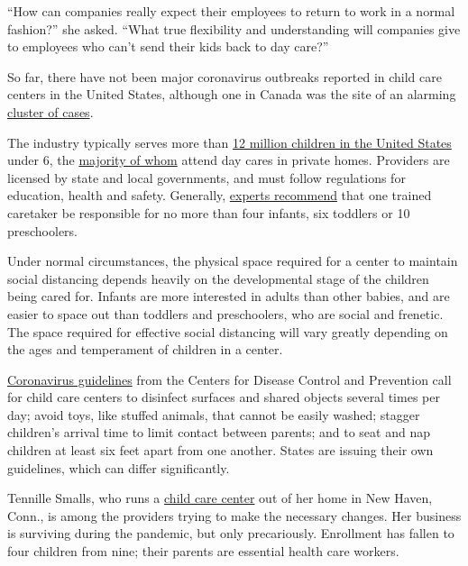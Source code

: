 ``How can companies really expect their employees to return to work in a
normal fashion?'' she asked. ``What true flexibility and understanding
will companies give to employees who can't send their kids back to day
care?''

So far, there have not been major coronavirus outbreaks reported in
child care centers in the United States, although one in Canada was the
site of an alarming
\href{https://montreal.ctvnews.ca/16-infected-north-of-montreal-in-quebec-s-first-covid-19-outbreak-in-a-daycare-1.4927853}{cluster
of cases}.

The industry typically serves more than
\href{https://cdn2.hubspot.net/hubfs/3957809/State\%20Fact\%20Sheets\%202019/2019StateFactSheets-Overview.pdf}{12
million children in the United States} under 6, the
\href{https://www.childtrends.org/most-child-care-providers-in-the-united-states-are-based-in-homes-not-centers}{majority
of whom} attend day cares in private homes. Providers are licensed by
state and local governments, and must follow regulations for education,
health and safety. Generally,
\href{https://www.childcare.gov/index.php/consumer-education/ratios-and-group-sizes}{experts
recommend} that one trained caretaker be responsible for no more than
four infants, six toddlers or 10 preschoolers.

Under normal circumstances, the physical space required for a center to
maintain social distancing depends heavily on the developmental stage of
the children being cared for. Infants are more interested in adults than
other babies, and are easier to space out than toddlers and
preschoolers, who are social and frenetic. The space required for
effective social distancing will vary greatly depending on the ages and
temperament of children in a center.

\href{https://www.cdc.gov/coronavirus/2019-ncov/downloads/php/CDC-Activities-Initiatives-for-COVID-19-Response.pdf}{Coronavirus
guidelines} from the Centers for Disease Control and Prevention call for
child care centers to disinfect surfaces and shared objects several
times per day; avoid toys, like stuffed animals, that cannot be easily
washed; stagger children's arrival time to limit contact between
parents; and to seat and nap children at least six feet apart from one
another. States are issuing their own guidelines, which can differ
significantly.

Tennille Smalls, who runs a
\href{https://www.instagram.com/gentlehandsacademydaycare/}{child care
center} out of her home in New Haven, Conn., is among the providers
trying to make the necessary changes. Her business is surviving during
the pandemic, but only precariously. Enrollment has fallen to four
children from nine; their parents are essential health care workers.

